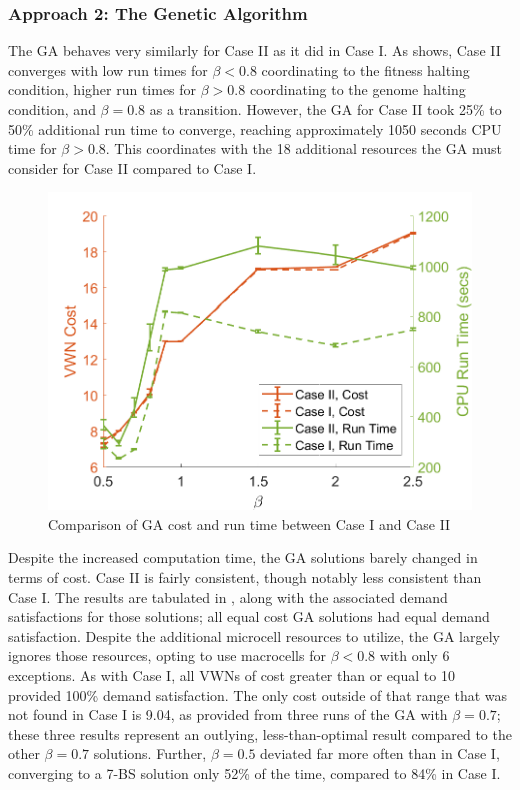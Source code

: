 \documentclass[12pt,dvipsnames]{report}
\begin{document}
\subsubsection{Approach 2: The Genetic Algorithm}

The GA behaves very similarly for Case II as it did in Case I.  As  shows, Case II converges with low run times for $\beta < 0.8$ coordinating to the fitness halting condition, higher run times for $\beta > 0.8$ coordinating to the genome halting condition, and $\beta = 0.8$ as a transition.  However, the GA for Case II took 25\% to 50\% additional run time to converge, reaching approximately 1050 seconds CPU time for $\beta > 0.8$.  This coordinates with the 18 additional resources the GA must consider for Case II compared to Case I.

\begin{figure}[htp]
	\centering
	\includegraphics[height=0.4\textheight]{Figures/CaseII_GAComparisonCostRunTimeCaseI}
	\caption{Comparison of GA cost and run time between Case I and Case II}
	\label{fig:CaseII_GAComparisonCostRunTimeCaseI}
\end{figure}

Despite the increased computation time, the GA solutions barely changed in terms of cost.  Case II is fairly consistent, though notably less consistent than Case I.  The results are tabulated in , along with the associated demand satisfactions for those solutions; all equal cost GA solutions had equal demand satisfaction.  Despite the additional microcell resources to utilize, the GA largely ignores those resources, opting to use macrocells for $\beta < 0.8$ with only 6 exceptions.  As with Case I, all VWNs of cost greater than or equal to 10 provided 100\% demand satisfaction.  The only cost outside of that range that was not found in Case I is 9.04, as provided from three runs of the GA with $\beta = 0.7$; these three results represent an outlying, less-than-optimal result compared to the other $\beta = 0.7$ solutions.  Further, $\beta = 0.5$ deviated far more often than in Case I, converging to a 7-BS solution only 52\% of the time, compared to 84\% in Case I.
\end{document}
